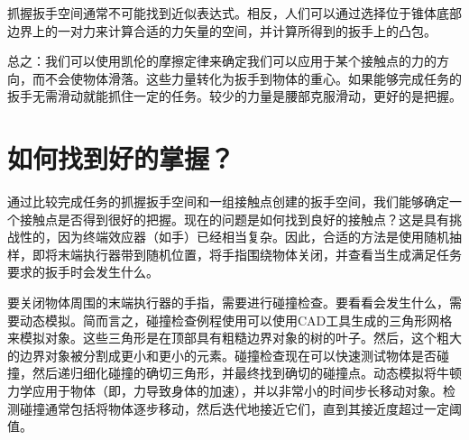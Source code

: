 抓握扳手空间通常不可能找到近似表达式。相反，人们可以通过选择位于锥体底部边界上的一对力来计算合适的力矢量的空间，并计算所得到的扳手上的凸包。

总之：我们可以使用凯伦的摩擦定律来确定我们可以应用于某个接触点的力的方向，而不会使物体滑落。这些力量转化为扳手到物体的重心。如果能够完成任务的扳手无需滑动就能抓住一定的任务。较少的力量是腰部克服滑动，更好的是把握。



\section{如何找到好的掌握？}
通过比较完成任务的抓握扳手空间和一组接触点创建的扳手空间，我们能够确定一个接触点是否得到很好的把握。现在的问题是如何找到良好的接触点？这是具有挑战性的，因为终端效应器（如手）已经相当复杂。因此，合适的方法是使用随机抽样，即将末端执行器带到随机位置，将手指围绕物体关闭，并查看当生成满足任务要求的扳手时会发生什么。

要关闭物体周围的末端执行器的手指，需要进行碰撞检查。要看看会发生什么，需要动态模拟。简而言之，碰撞检查例程使用可以使用CAD工具生成的三角形网格来模拟对象。这些三角形是在顶部具有粗糙边界对象的树的叶子。然后，这个粗大的边界对象被分割成更小和更小的元素。碰撞检查现在可以快速测试物体是否碰撞，然后递归细化碰撞的确切三角形，并最终找到确切的碰撞点。动态模拟将牛顿力学应用于物体（即，力导致身体的加速），并以非常小的时间步长移动对象。检测碰撞通常包括将物体逐步移动，然后迭代地接近它们，直到其接近度超过一定阈值。
